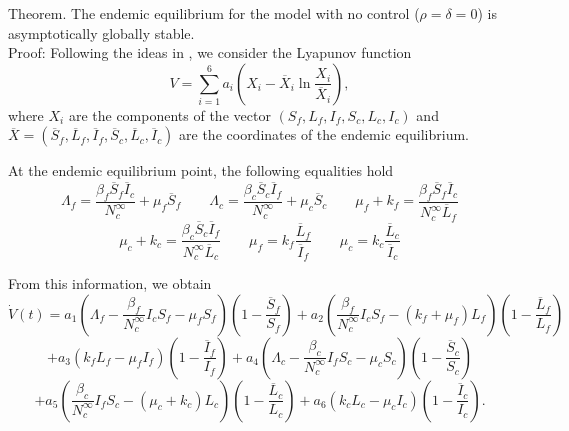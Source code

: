 \documentclass[preprint,12pt]{elsarticle}
\begin{document}
\noindent Theorem. The endemic equilibrium for the model with no control ($\rho=\delta=0$) is asymptotically globally stable.\\
Proof: Following the ideas in \cite{Zhou:2014}, we consider the Lyapunov function
$$V=\sum_{i=1}^6a_i\left(X_i-\overline{X}_i\ln{\frac{X_i}{\overline{X}_i}}\right),$$ where $X_i$ are the components of the vector $(S_f,L_f,I_f,S_c,L_c,I_c)$ and $\overline{X}=(\overline{S}_f,\overline{L}_f,\overline{I}_f,\overline{S}_c,\overline{L}_c,\overline{I}_c)$ are the coordinates of the endemic equilibrium. 

\noindent At the endemic equilibrium point, the following equalities hold
$$\Lambda_f=\frac{\beta_f\overline{S}_f\overline{I}_c}{N_c^{\infty}}+\mu_f\overline{S}_f \qquad \Lambda_c=\frac{\beta_c\overline{S}_c\overline{I}_f}{N_c^{\infty}}+\mu_c\overline{S}_c \qquad \mu_f+k_f=\frac{\beta_f\overline{S}_f\overline{I}_c}{N_c^{\infty}\overline{L}_f}$$
\begin{equation}\label{endemic_equalities}
\mu_c+k_c=\frac{\beta_c\overline{S}_c\overline{I}_f}{N_c^{\infty}\overline{L}_c} \qquad \mu_f=k_f\frac{\overline{L}_f}{\overline{I}_f} \qquad \mu_c= k_c\frac{\overline{L}_c}{\overline{I}_c}
\end{equation}

\noindent From this information, we obtain 
$$\dot{V}(t)=a_1\left(\Lambda_f-\frac{\beta_f}{N_c^{\infty}}I_cS_f-\mu_fS_f\right)\left(1-\frac{\overline{S}_f}{S_f}\right)+a_2\left(\frac{\beta_f}{N_c^{\infty}}I_cS_f-\left(k_f+\mu_f\right)L_f\right)\left(1-\frac{\overline{L}_f}{L_f}\right)$$
$$+a_3\left(k_f L_f-\mu_fI_f\right)\left(1-\frac{\overline{I}_f}{I_f}\right)+a_4\left(\Lambda_c-\frac{\beta_c}{N_c^{\infty}}I_fS_c-\mu_cS_c\right)\left(1-\frac{\overline{S}_c}{S_c}\right)$$
$$+a_5\left(\frac{\beta_c}{N_c^{\infty}}I_fS_c-\left(\mu_c+k_c\right)L_c\right)\left(1-\frac{\overline{L}_c}{L_c}\right)+a_6\left(k_c L_c-\mu_cI_c\right)\left(1-\frac{\overline{I}_c}{I_c}\right).$$
\end{document}
